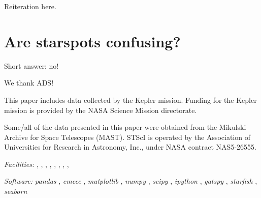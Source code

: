 \documentclass[twocolumn]{emulateapj}%
\newcommand{\project}[1]{\textsl{#1}}
\begin{document}
Reiteration here.

\clearpage
\pagebreak


\appendix

\section{Are starspots confusing?}
\label{methods-details}

Short answer: no!

\acknowledgements

We thank ADS!

This paper includes data collected by the Kepler mission. Funding for the Kepler mission is provided by the NASA Science Mission directorate.

Some/all of the data presented in this paper were obtained from the Mikulski Archive for Space Telescopes (MAST). STScI is operated by the Association of Universities for Research in Astronomy, Inc., under NASA contract NAS5-26555.


{\it Facilities:} , , , , , , , , 

{\it Software: }
 \project{pandas} \citep{mckinney10},
 \project{emcee} \citep{foreman13},
 \project{matplotlib} \citep{hunter07},
 \project{numpy} \citep{vanderwalt11},
 \project{scipy} \citep{jones01},
 \project{ipython} \citep{perez07},
 \project{gatspy} \citep{JakeVanderplas2015},
 \project{starfish} \citep{czekala15},
 \project{seaborn} \citep{waskom14}

\clearpage



\end{document}
